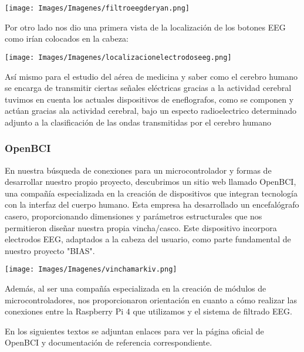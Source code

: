 \documentclass{article}
\begin{document}
\begin{center}
    \texttt{[image: Images/Imagenes/filtroeegderyan.png]}\\
\end{center}

Por otro lado nos dio una primera vista de la localización de los botones EEG como irían colocados en la cabeza:

\begin{center}
    \texttt{[image: Images/Imagenes/localizacionelectrodoseeg.png]}\\

\end{center}

Así mismo para el estudio del aérea de medicina y saber como el cerebro humano se encarga de transmitir ciertas señales eléctricas gracias a la actividad cerebral  tuvimos en cuenta los actuales dispositivos de eneflografos, como se componen y actúan gracias ala actividad cerebral, bajo un especto radioelectrico determinado adjunto a la clasificación de las ondas transmitidas por el cerebro humano

\subsubsection{OpenBCI}

En nuestra búsqueda de conexiones para un microcontrolador y formas de desarrollar nuestro propio proyecto, descubrimos un sitio web llamado OpenBCI, una compañía especializada en la creación de dispositivos que integran tecnología con la interfaz del cuerpo humano. Esta empresa ha desarrollado un encefalógrafo casero, proporcionando dimensiones y parámetros estructurales que nos permitieron diseñar nuestra propia vincha/casco. Este dispositivo incorpora electrodos EEG, adaptados a la cabeza del usuario, como parte fundamental de nuestro proyecto "BIAS".

\begin{center}
    \texttt{[image: Images/Imagenes/vinchamarkiv.png]}\\
\end{center}

Además, al ser una compañía especializada en la creación de módulos de microcontroladores, nos proporcionaron orientación en cuanto a cómo realizar las conexiones entre la Raspberry Pi 4 que utilizamos y el sistema de filtrado EEG.

En los siguientes textos se adjuntan enlaces para ver la página oficial de OpenBCI y documentación de referencia correspondiente.
\end{document}
